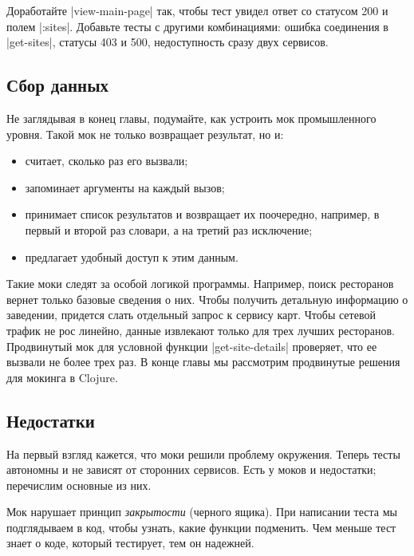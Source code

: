 Доработайте \spverb|view-main-page| так, чтобы тест увидел ответ со статусом 200
и полем \spverb|:sites|. Добавьте тесты с другими комбинациями: ошибка
соединения в \spverb|get-sites|, статусы 403 и 500, недоступность сразу двух
сервисов.

\subsection{Сбор данных}

Не заглядывая в конец главы, подумайте, как устроить мок промышленного
уровня. Такой мок не только возвращает результат, но и:

\begin{itemize}

\item
  считает, сколько раз его вызвали;

\item
  запоминает аргументы на каждый вызов;

\item
  принимает список результатов и возвращает их поочередно, например, в первый и
  второй раз словари, а на третий раз исключение;

\item
  предлагает удобный доступ к этим данным.

\end{itemize}

Такие моки следят за особой логикой программы. Например, поиск ресторанов вернет
только базовые сведения о них. Чтобы получить детальную информацию о заведении,
придется слать отдельный запрос к сервису карт. Чтобы сетевой трафик не рос
линейно, данные извлекают только для трех лучших ресторанов. Продвинутый мок для
условной функции \spverb|get-site-details| проверяет, что ее вызвали не более
трех раз. В конце главы мы рассмотрим продвинутые решения для мокинга в Clojure.

\subsection{Недостатки}

На первый взгляд кажется, что моки решили проблему окружения. Теперь тесты
автономны и не зависят от сторонних сервисов. Есть у моков и недостатки;
перечислим основные из них.

Мок нарушает принцип \emph{закрытости} (черного ящика). При написании теста мы
подглядываем в код, чтобы узнать, какие функции подменить. Чем меньше тест знает
о коде, который тестирует, тем он надежней.

